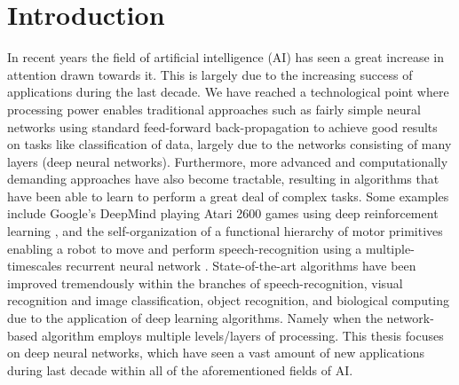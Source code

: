 
\chapter{Introduction}\label{chpt:intro}

In recent years the field of artificial intelligence (AI) has seen a great increase in attention drawn towards it. This is largely due to the increasing success of applications during the last decade. We have reached a technological point where processing power enables traditional approaches such as fairly simple neural networks using standard feed-forward back-propagation to achieve good results on tasks like classification of data, largely due to the networks consisting of many layers (deep neural networks). Furthermore, more advanced and computationally demanding approaches have also become tractable, resulting in algorithms that have been able to learn to perform a great deal of complex tasks. Some examples include Google's DeepMind playing Atari 2600 games using deep reinforcement learning \citep{Mnih2015}, and the self-organization of a functional hierarchy of motor primitives enabling a robot to move and perform speech-recognition using a multiple-timescales recurrent neural network \citep{Tani2014}. State-of-the-art algorithms have been improved tremendously within the branches of speech-recognition, visual recognition and image classification, object recognition, and biological computing \citep{LeCun2015} due to the application of deep learning algorithms. Namely when the network-based algorithm employs multiple levels/layers of processing. This thesis focuses on deep neural networks, which have seen a vast amount of new applications during last decade within all of the aforementioned fields of AI.
\\


